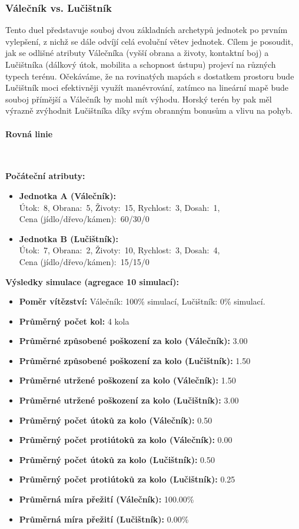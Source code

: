 \subsubsection{Válečník vs. Lučištník}

Tento duel představuje souboj dvou základních archetypů jednotek po prvním vylepšení, z nichž se dále odvíjí celá evoluční větev jednotek. Cílem je posoudit, jak se odlišné atributy Válečníka (vyšší obrana a životy, kontaktní boj) a Lučištníka (dálkový útok, mobilita a schopnost ústupu) projeví na různých typech terénu. Očekáváme, že na rovinatých mapách s dostatkem prostoru bude Lučištník moci efektivněji využít manévrování, zatímco na lineární mapě bude souboj přímější a Válečník by mohl mít výhodu. Horský terén by pak měl výrazně zvýhodnit Lučištníka díky svým obranným bonusům a vlivu na pohyb.


\paragraph{Rovná linie}~ \newline

\textbf{Počáteční atributy:}
\begin{itemize}
\item \textbf{Jednotka A (Válečník):} \\ Útok:~8, Obrana:~5, Životy:~15, Rychlost:~3, Dosah:~1, \\ Cena (jídlo/dřevo/kámen):~60/30/0
\item \textbf{Jednotka B (Lučištník):} \\ Útok:~7, Obrana:~2, Životy:~10, Rychlost:~3, Dosah:~4, \\ Cena (jídlo/dřevo/kámen):~15/15/0
\end{itemize}

\textbf{Výsledky simulace (agregace 10 simulací):}
\begin{itemize}
\item \textbf{Poměr vítězství:} Válečník: 100\% simulací, Lučištník: 0\% simulací.
\item \textbf{Průměrný počet kol:} 4 kola
\item \textbf{Průměrné způsobené poškození za kolo (Válečník):} 3.00
\item \textbf{Průměrné způsobené poškození za kolo (Lučištník):} 1.50
\item \textbf{Průměrné utržené poškození za kolo (Válečník):} 1.50
\item \textbf{Průměrné utržené poškození za kolo (Lučištník):} 3.00
\item \textbf{Průměrný počet útoků za kolo (Válečník):} 0.50
\item \textbf{Průměrný počet protiútoků za kolo (Válečník):} 0.00
\item \textbf{Průměrný počet útoků za kolo (Lučištník):} 0.50
\item \textbf{Průměrný počet protiútoků za kolo (Lučištník):} 0.25
\item \textbf{Průměrná míra přežití (Válečník):} 100.00\%
\item \textbf{Průměrná míra přežití (Lučištník):} 0.00\%
\end{itemize}

